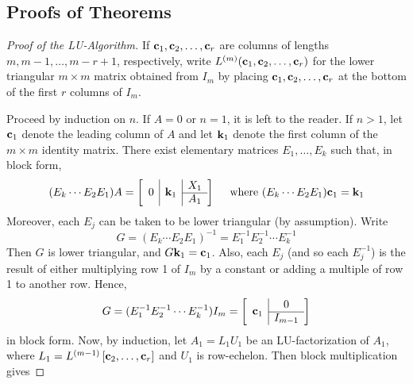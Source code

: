 \subsection*{Proofs of Theorems}

\begin{proof}[Proof of the LU-Algorithm]
If $\textbf{c}_{1}, \textbf{c}_{2}, \dots, \textbf{c}_{r}$ are columns of lengths $m, m - 1, \dots, m - r + 1$, respectively, write $L^{(m)}(\textbf{c}_{1}, \textbf{c}_{2}, \dots, \textbf{c}_{r})$ for the lower triangular $m \times m$ matrix obtained from $I_{m}$ by placing $\textbf{c}_{1}, \textbf{c}_{2}, \dots, \textbf{c}_{r}$ at the bottom of the first $r$ columns of $I_{m}$.

Proceed by induction on $n$. If $A = 0$ or $n = 1$, it is left to the reader. If $n > 1$, let $\textbf{c}_{1}$ denote the leading column of $A$ and let $\textbf{k}_{1}$ denote the first column of the $m \times m$ identity matrix. There exist elementary matrices $E_{1}, \dots, E_{k}$ such that, in block form,
\begin{equation*}
(E_{k} \cdots E_{2}E_{1})A = \leftB \begin{array}{c|c|c}
\multirow{2}{*}{$0$} & \multirow{2}{*}{$\vect{k}_1$} & X_1 \\\cline{3-3}
& & A_1
\end{array}\rightB \quad \mbox{ where } (E_{k} \cdots E_{2}E_{1})\vect{c}_{1} = \vect{k}_{1}
\end{equation*}
Moreover, each $E_{j}$ can be taken to be lower triangular (by assumption). Write
\begin{equation*}
G = (E_{k} \cdots E_{2}E_{1})^{-1} = E_{1}^{-1}E_{2}^{-1} \cdots E_{k}^{-1}
\end{equation*}
Then $G$ is lower triangular, and $G\textbf{k}_{1} = \textbf{c}_{1}$. Also, each $E_{j}$ (and so each $E_{j}^{-1}$) is the result of either multiplying row 1 of $I_{m}$ by a constant or adding a multiple of row 1 to another row. Hence,
\begin{equation*}
G = (E_{1}^{-1}E_{2}^{-1} \cdots E_{k}^{-1})I_{m} = \leftB \begin{array}{c|c}
\multirow{2}{*}{$\vect{c}_{1}$} & 0 \\\cline{2-2}
& I_{m-1}
\end{array}\rightB
\end{equation*}
in block form. Now, by induction, let $A_{1} = L_{1}U_{1}$ be an LU-factorization of $A_{1}$, where $L_{1} = L^{(m-1)} \left[ \textbf{c}_{2}, \dots, \textbf{c}_{r} \right]$ and $U_{1}$ is row-echelon. Then block multiplication gives

\end{proof}
